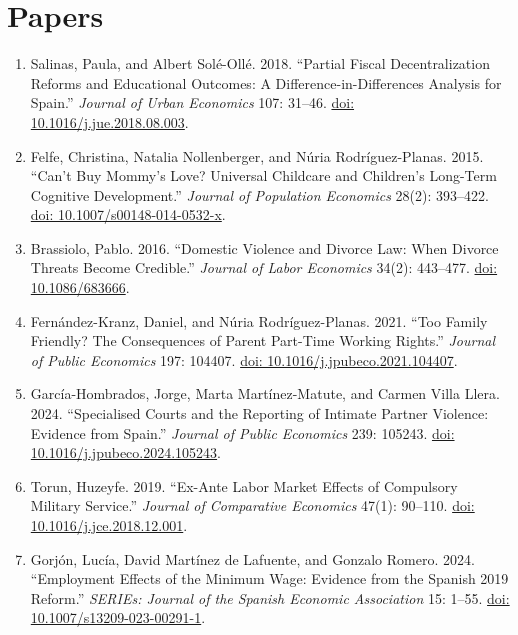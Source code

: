 \documentclass[12pt]{article}
\begin{document}
\section*{Papers}\label{sec:papers}

{\raggedright
\begin{enumerate}[leftmargin=*]

    \item Salinas, Paula, and Albert Sol\'e-Oll\'e. 2018. ``Partial Fiscal Decentralization Reforms and Educational Outcomes: A Difference-in-Differences Analysis for Spain.'' \emph{Journal of Urban Economics} 107: 31--46. \href{https://doi.org/10.1016/j.jue.2018.08.003}{doi: 10.1016/j.jue.2018.08.003}.

    \item Felfe, Christina, Natalia Nollenberger, and N\'uria Rodr\'iguez-Planas. 2015. ``Can{'}t Buy Mommy{'}s Love? Universal Childcare and Children{'}s Long-Term Cognitive Development.'' \emph{Journal of Population Economics} 28(2): 393--422. \href{https://doi.org/10.1007/s00148-014-0532-x}{doi: 10.1007/s00148-014-0532-x}.

    \item Brassiolo, Pablo. 2016. ``Domestic Violence and Divorce Law: When Divorce Threats Become Credible.'' \emph{Journal of Labor Economics} 34(2): 443--477. \href{https://doi.org/10.1086/683666}{doi: 10.1086/683666}.

    \item Fern\'andez-Kranz, Daniel, and N\'uria Rodr\'iguez-Planas. 2021. ``Too Family Friendly? The Consequences of Parent Part-Time Working Rights.'' \emph{Journal of Public Economics} 197: 104407. \href{https://doi.org/10.1016/j.jpubeco.2021.104407}{doi: 10.1016/j.jpubeco.2021.104407}.

    \item Garc\'ia-Hombrados, Jorge, Marta Mart\'inez-Matute, and Carmen Villa Llera. 2024. ``Specialised Courts and the Reporting of Intimate Partner Violence: Evidence from Spain.'' \emph{Journal of Public Economics} 239: 105243. \href{https://doi.org/10.1016/j.jpubeco.2024.105243}{doi: 10.1016/j.jpubeco.2024.105243}.

    \item Torun, Huzeyfe. 2019. ``Ex-Ante Labor Market Effects of Compulsory Military Service.'' \emph{Journal of Comparative Economics} 47(1): 90--110. \href{https://doi.org/10.1016/j.jce.2018.12.001}{doi: 10.1016/j.jce.2018.12.001}.

    \item Gorj\'on, Luc\'ia, David Mart\'inez de Lafuente, and Gonzalo Romero. 2024. ``Employment Effects of the Minimum Wage: Evidence from the Spanish 2019 Reform.'' \emph{SERIEs: Journal of the Spanish Economic Association} 15: 1--55. \href{https://doi.org/10.1007/s13209-023-00291-1}{doi: 10.1007/s13209-023-00291-1}.


\end{enumerate}}
\end{document}
